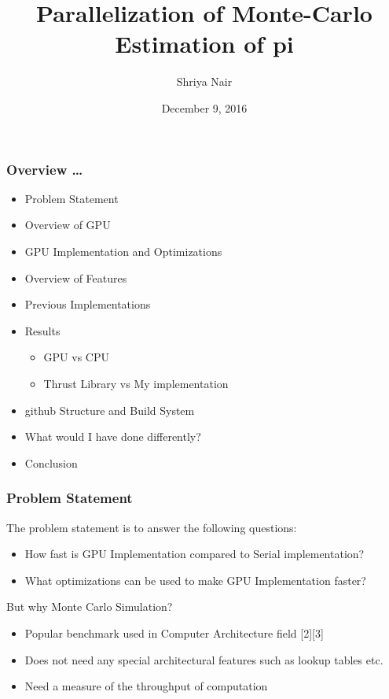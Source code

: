 \documentclass[mathserif]{beamer}
\date{December 9, 2016}
\author[Shriya Nair]{Shriya Nair}
\institute{The University of Texas at Austin}
\title[GPU Monte-Carlo pi]{Parallelization of Monte-Carlo Estimation of pi}
\begin{document}
\begin{frame}
\begin{center}
\end{center}
\titlepage
\begin{flushright}
\end{flushright}
\end{frame}

\begin{frame}
\frametitle{Overview \ldots}

\begin{itemize}
\item Problem Statement
\item Overview of GPU
\item GPU Implementation and Optimizations
\item Overview of Features
\item Previous Implementations
\item Results   
\begin{itemize}
\item GPU vs CPU
\item Thrust Library vs My implementation
\end{itemize}
\item github Structure and Build System
\item What would I have done differently?
\item Conclusion
\end{itemize}

\end{frame}

\begin{frame}
\frametitle{Problem Statement}

The problem statement is to answer the following questions: 
\begin{itemize}
\item How fast is GPU Implementation compared to Serial implementation?
\item What optimizations can be used to make GPU Implementation faster? 
\end{itemize}
But why Monte Carlo Simulation?
\begin{itemize}
\item Popular benchmark used in Computer Architecture field [2][3] 
\item Does not need any special architectural features such as lookup tables etc. 
\item Need a measure of the throughput of computation 
\end{itemize}
\end{frame}
\end{document}
